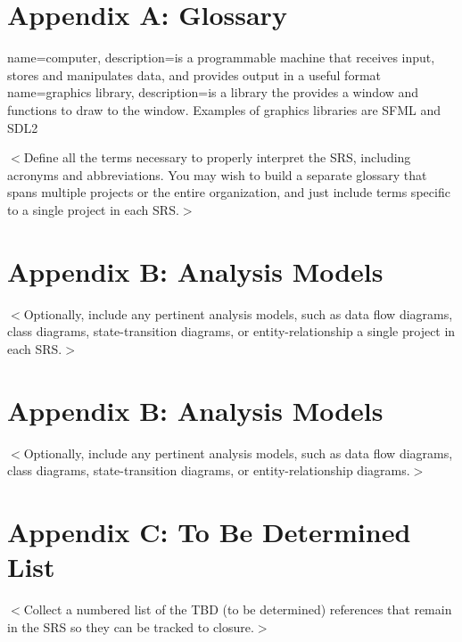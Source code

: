 \documentclass{scrreprt}
\begin{document}
\section{Appendix A: Glossary}

{
  name=computer,
  description={is a programmable machine that receives input,
               stores and manipulates data, and provides
               output in a useful format}
}
{
  name=graphics library,
  description={is a library the provides a window and functions to draw to the window.  Examples of graphics libraries are SFML and SDL2}
}


\renewcommand{\glossarysection}[2][]{} %
\printglossaries

$<$Define all the terms necessary to properly interpret the SRS, including 
acronyms and abbreviations. You may wish to build a separate glossary that spans 
multiple projects or the entire organization, and just include terms specific to 
a single project in each SRS.$>$

\section{Appendix B: Analysis Models}
$<$Optionally, include any pertinent analysis models, such as data flow 
diagrams, class diagrams, state-transition diagrams, or entity-relationship 
a single project in each SRS.$>$

\section{Appendix B: Analysis Models}
$<$Optionally, include any pertinent analysis models, such as data flow 
diagrams, class diagrams, state-transition diagrams, or entity-relationship 
diagrams.$>$

\section{Appendix C: To Be Determined List}
$<$Collect a numbered list of the TBD (to be determined) references that remain 
in the SRS so they can be tracked to closure.$>$
\end{document}
